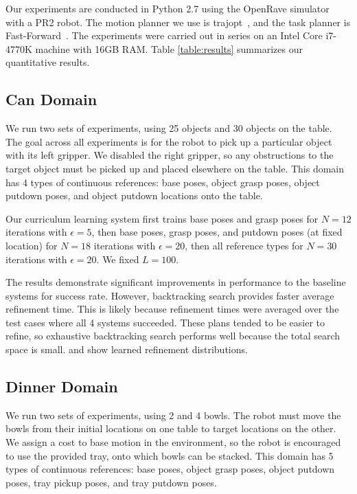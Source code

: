 Our experiments are conducted in Python 2.7 using the OpenRave simulator~\cite{Diankov_2008_6117} with a PR2 robot.
The motion planner we use is trajopt~\cite{schulman2013finding}, and the task planner is Fast-Forward~\cite{FF}.
The experiments were carried out in series on an Intel Core i7-4770K machine with 16GB RAM.
Table \ref{table:results} summarizes our quantitative results.

\subsection{Can Domain}
We run two sets of experiments, using 25 objects and 30 objects on the table.
The goal across all experiments is for the robot to pick up a particular object with its
left gripper. We disabled the right gripper, so any obstructions to the target object must be picked up and
placed elsewhere on the table. This domain has 4 types of continuous references: base poses, object grasp
poses, object putdown poses, and object putdown locations onto the table.

Our curriculum learning system first trains base poses and grasp poses for $N = 12$ iterations with $\epsilon = 5$,
then base poses, grasp poses, and putdown poses (at fixed location) for $N = 18$ iterations with $\epsilon = 20$,
then all reference types for $N = 30$ iterations with $\epsilon = 20$. We fixed $L = 100$.

The results demonstrate significant improvements in performance to the baseline systems for success rate.
However, backtracking search provides faster average refinement time. This is likely because
refinement times were averaged over the test cases where all 4 systems succeeded. These plans tended
to be easier to refine, so exhaustive backtracking search performs well because the total search space is small.
 and  show learned refinement distributions.

\subsection{Dinner Domain}
We run two sets of experiments, using 2 and 4 bowls. The robot must move the
bowls from their initial locations on one table to target locations on the other. We assign a cost to
base motion in the environment, so the robot is encouraged to use the provided tray, onto which bowls can be stacked.
This domain has 5 types of continuous references: base poses, object grasp poses, object putdown poses, tray pickup
poses, and tray putdown poses.

